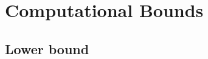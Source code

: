 \documentclass[12pt]{article}
\makeatletter
\newcommand{\s}[1]{\mathsf{#1}}
\renewcommand{\paragraph}{%
  \@startsection{paragraph}{4}%
  {\z@}{1.25ex \@plus 1ex \@minus .2ex}{-1em}%
  {\normalfont\normalsize\bfseries}%
}
\makeatother
\begin{document}

\section{Computational Bounds}\label{sec:complowerbounds}

\subsection{Lower bound}
\end{document}
